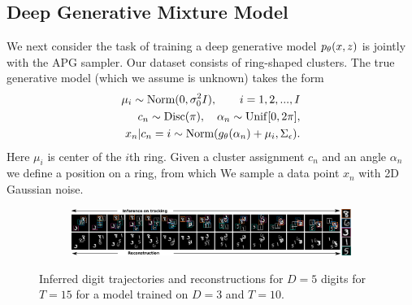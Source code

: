 \documentclass[anonymous=false, %
               format=acmsmall, %
               review=true, %
               screen=true, %
               nonacm=true]{acmart}
\theoremstyle{definition}
\begin{document}
\subsection{Deep Generative Mixture Model}
We next consider the task of training a deep generative model $p_\theta(x, z)$ is jointly with the APG sampler. Our dataset consists of ring-shaped clusters. The true generative model (which we assume is unknown) takes the form
\begin{align*}
    \mu_i \sim \text{Norm}(0, 
    \sigma_0^2 I), 
    \qquad i = 1, 2, ..., I \\
    c_n \sim \mathrm{Disc}(\pi), \quad \alpha_n \sim \mathrm{Unif}[0, 2\pi], \\
    x_n | c_n=i \sim \text{Norm}(g_\theta(\alpha_n) + \mu_i, \Sigma_\epsilon).
\end{align*}
Here $\mu_i$ is center of the $i$th ring. Given a cluster assignment $c_n$ and an angle $\alpha_n$ we define a position on a ring, from which We sample a data point $x_n$ with 2D Gaussian noise.

\begin{figure}[!h]
  \centering
  \begin{subfigure}[t]{1.0\textwidth}
  \includegraphics[width=1.0\textwidth]{figures/bmnist-5digits-samples.pdf}
  \end{subfigure}
  \caption{Inferred digit trajectories and reconstructions for $D = 5$ digits for $T = 15$ for a model trained on $D = 3$ and $T = 10$.}
  \label{mnist-qualitative}
\end{figure}
\end{document}
